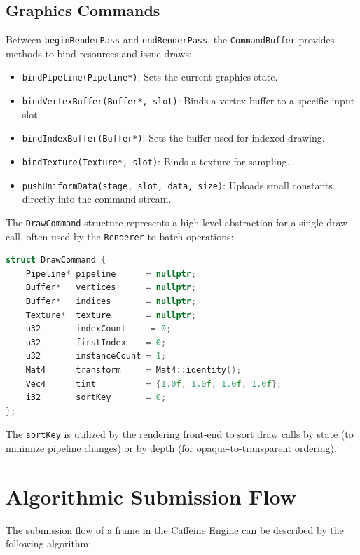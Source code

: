 \subsection{Graphics Commands}

Between \texttt{beginRenderPass} and \texttt{endRenderPass}, the \texttt{CommandBuffer} provides methods to bind resources and issue draws:

\begin{itemize}
    \item \texttt{bindPipeline(Pipeline*)}: Sets the current graphics state.
    \item \texttt{bindVertexBuffer(Buffer*, slot)}: Binds a vertex buffer to a specific input slot.
    \item \texttt{bindIndexBuffer(Buffer*)}: Sets the buffer used for indexed drawing.
    \item \texttt{bindTexture(Texture*, slot)}: Binds a texture for sampling.
    \item \texttt{pushUniformData(stage, slot, data, size)}: Uploads small constants directly into the command stream.
\end{itemize}

The \texttt{DrawCommand} structure represents a high-level abstraction for a single draw call, often used by the \texttt{Renderer} to batch operations:

\begin{lstlisting}[language=C++]
struct DrawCommand {
    Pipeline* pipeline      = nullptr;
    Buffer*   vertices      = nullptr;
    Buffer*   indices       = nullptr;
    Texture*  texture       = nullptr;
    u32       indexCount     = 0;
    u32       firstIndex    = 0;
    u32       instanceCount = 1;
    Mat4      transform     = Mat4::identity();
    Vec4      tint          = {1.0f, 1.0f, 1.0f, 1.0f};
    i32       sortKey       = 0;
};
\end{lstlisting}

The \texttt{sortKey} is utilized by the rendering front-end to sort draw calls by state (to minimize pipeline changes) or by depth (for opaque-to-transparent ordering).

\section{Algorithmic Submission Flow}

The submission flow of a frame in the Caffeine Engine can be described by the following algorithm:

